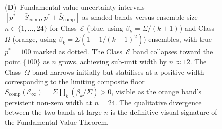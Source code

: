 \begin{figure}[!htbp]
{    (\textbf{D})~Fundamental value uncertainty intervals $[p^* - \bar{S}_{\mathrm{comp}}, p^* + \bar{S}_{\mathrm{comp}}]$ as shaded bands versus ensemble size $n \in \{1, \ldots, 24\}$ for Class~$\mathcal{E}$ (blue, using $\beta_k = \Sigma/(k+1)$) and Class~$\Omega$ (orange, using $\beta_k = \Sigma(1 - 1/(k+1)^2)$) ensembles, with true $p^* = 100$ marked as dotted.  The Class~$\mathcal{E}$ band collapses toward the point $\{100\}$ as $n$ grows, achieving sub-unit width by $n \approx 12$.  The Class~$\Omega$ band narrows initially but stabilises at a positive width corresponding to the limiting composite floor $\bar{S}_{\mathrm{comp}}(\mathcal{E}_\infty) = \Sigma \prod_k (\beta_k/\Sigma) > 0$, visible as the orange band's persistent non-zero width at $n = 24$.  The qualitative divergence between the two bands at large $n$ is the definitive visual signature of the Fundamental Value Theorem.}
    \label{fig:price_panel_4}
\end{figure}

